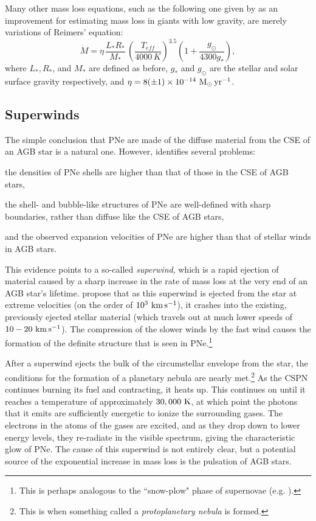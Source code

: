 \documentclass[twocolumn]{aastex63}
\begin{document}
Many other mass loss equations, such as the following one given by \cite{schroeder} as an improvement for estimating mass loss in giants with low gravity, are merely variations of Reimers' equation:
\begin{equation*}
    \dot M = \eta\,\frac{L_*R_*}{M_*}\,\left(\frac{T_{eff}}{4000\,K}\right)^{3.5}\left(1+\frac{g_\odot}{4300g_*}\right),
\end{equation*}
where $L_*, R_*$, and $M_*$ are defined as before, $g_*$ and $g_\odot$ are the stellar and solar surface gravity respectively, and $\eta = 8 (\pm 1) \times 10^{-14}~{\rm M_\odot\,yr^{-1}}$. 



\subsection{Superwinds} \label{subsec:superwinds}

The simple conclusion that PNe are made of the diffuse material from the CSE of an AGB star is a natural one. However, \cite{kwok2000} identifies several problems: 
\begin{enumerate*}[label=(\roman*)]
    \item the densities of PNe shells are higher than that of those in the CSE of AGB stars,
    \item the shell- and bubble-like structures of PNe are well-defined with sharp boundaries, rather than diffuse like the CSE of AGB stars, 
    \item and the observed expansion velocities of PNe are higher than that of stellar winds in AGB stars. 
\end{enumerate*}

This evidence points to a so-called \textit{superwind}, which is a rapid ejection of material caused by a sharp increase in the rate of mass loss at the very end of an AGB star's lifetime. \cite{kwok1978} propose that as this superwind is ejected from the star at extreme velocities (on the order of $10^{3}~{\rm km\,s^{-1}}$), it crashes into the existing, previously ejected stellar material (which travels out at much lower speeds of $10-20~{\rm km\,s^{-1}}$). The compression of the slower winds by the fast wind causes the formation of the definite structure that is seen in PNe.\footnote{This is perhaps analogous to the ``snow-plow" phase of supernovae (e.g. \cite{moriya, mccray}).}

After a superwind ejects the bulk of the circumstellar envelope from the star, the conditions for the formation of a planetary nebula are nearly met.\footnote{This is when something called a \textit{protoplanetary nebula} is formed.} As the CSPN continues burning its fuel and contracting, it heats up. This continues on until it reaches a temperature of approximately $30,000~{\rm K}$, at which point the photons that it emits are sufficiently energetic to ionize the surrounding gases. The electrons in the atoms of the gases are excited, and as they drop down to lower energy levels, they re-radiate in the visible spectrum, giving the characteristic glow of PNe. The cause of this superwind is not entirely clear, but a potential source of the exponential increase in mass loss is the pulsation of AGB stars. 
\end{document}
